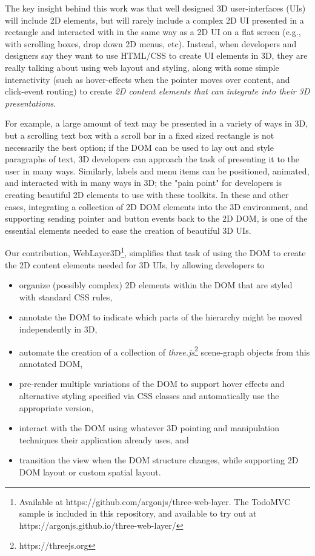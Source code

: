 \documentclass[sigconf]{acmart}
\begin{document}
The key insight behind this work was that well designed 3D user-interfaces (UIs) will include 2D elements, but will rarely include a complex 2D UI presented in a rectangle and interacted with in the same way as a 2D UI on a flat screen (e.g., with scrolling boxes, drop down 2D menus, etc).  Instead, when developers and designers say they want to use HTML/CSS to create UI elements in 3D, they are really talking about using web layout and styling, along with some simple interactivity (such as hover-effects when the pointer moves over content, and click-event routing) to create \textit{2D content elements that can integrate into their 3D presentations}.  

For example, a large amount of text may be presented in a variety of ways in 3D, but a scrolling text box with a scroll bar in a fixed sized rectangle is not necessarily the best option; if the DOM can be used to lay out and style paragraphs of text, 3D developers can approach the task of presenting it to the user in many ways. Similarly, labels \cite{Tatzgern2014HedgehogSpace} and menu items \cite{BowmanDesignEnvironments} can be positioned, animated, and interacted with in many ways in 3D; the "pain point" for developers is creating beautiful 2D elements to use with these toolkits.  In these and other cases, integrating a collection of 2D DOM elements into the 3D environment, and supporting sending pointer and button events back to the 2D DOM, is one of the essential elements needed to ease the creation of beautiful 3D UIs. 

Our contribution, WebLayer3D\footnote{Available at https://github.com/argonjs/three-web-layer. The TodoMVC sample is included in this repository, and available to try out at https://argonjs.github.io/three-web-layer/}, simplifies that task of using the DOM to create the 2D content elements needed for 3D UIs, by allowing developers to
\begin{itemize}
\item organize (possibly complex) 2D elements within the DOM that are styled with standard CSS rules,
\item annotate the DOM to indicate which parts of the hierarchy might be moved independently in 3D,
\item automate the creation of a collection of \textit{three.js}\footnote{https://threejs.org} scene-graph objects from this annotated DOM,
\item pre-render multiple variations of the DOM to support hover effects and alternative styling specified via CSS classes and automatically use the appropriate version, 
\item interact with the DOM using whatever 3D pointing and manipulation techniques their application already uses, and
\item transition the view when the DOM structure changes, while supporting 2D DOM layout or custom spatial layout.
\end{itemize}
\end{document}
